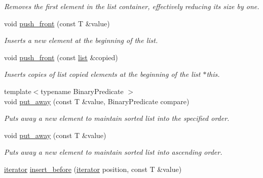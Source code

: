 \begin{DoxyCompactItemize}
\begin{DoxyCompactList}\small\item\em Removes the first element in the {\itshape list} container, effectively reducing its size by one. \end{DoxyCompactList}\item 
\hypertarget{classofeli_1_1list_a87b7f6a90670e08d99e23f3377b001f9}{void \hyperlink{classofeli_1_1list_a87b7f6a90670e08d99e23f3377b001f9}{push\-\_\-front} (const T \&value)}\label{classofeli_1_1list_a87b7f6a90670e08d99e23f3377b001f9}

\begin{DoxyCompactList}\small\item\em Inserts a new element at the beginning of the list. \end{DoxyCompactList}\item 
\hypertarget{classofeli_1_1list_a05ae0af886d7932bdf5a5183e2a64c91}{void \hyperlink{classofeli_1_1list_a05ae0af886d7932bdf5a5183e2a64c91}{push\-\_\-front} (const \hyperlink{classofeli_1_1list}{list} \&copied)}\label{classofeli_1_1list_a05ae0af886d7932bdf5a5183e2a64c91}

\begin{DoxyCompactList}\small\item\em Inserts copies of list {\itshape copied} elements at the beginning of the list {\itshape $\ast$this}. \end{DoxyCompactList}\item 
\hypertarget{classofeli_1_1list_a3925aa31728a510af35d3229cd00a43f}{{\footnotesize template$<$typename Binary\-Predicate $>$ }\\void \hyperlink{classofeli_1_1list_a3925aa31728a510af35d3229cd00a43f}{put\-\_\-away} (const T \&value, Binary\-Predicate compare)}\label{classofeli_1_1list_a3925aa31728a510af35d3229cd00a43f}

\begin{DoxyCompactList}\small\item\em Puts away a new element to maintain sorted list into the specified order. \end{DoxyCompactList}\item 
\hypertarget{classofeli_1_1list_a0970694ba9e35222daa2ecc156f71661}{void \hyperlink{classofeli_1_1list_a0970694ba9e35222daa2ecc156f71661}{put\-\_\-away} (const T \&value)}\label{classofeli_1_1list_a0970694ba9e35222daa2ecc156f71661}

\begin{DoxyCompactList}\small\item\em Puts away a new element to maintain sorted list into ascending order. \end{DoxyCompactList}\item 
\hypertarget{classofeli_1_1list_a347778b1ef2f0530cb73403665f28caf}{\hyperlink{classofeli_1_1list_1_1iterator}{iterator} \hyperlink{classofeli_1_1list_a347778b1ef2f0530cb73403665f28caf}{insert\-\_\-before} (\hyperlink{classofeli_1_1list_1_1iterator}{iterator} position, const T \&value)}\label{classofeli_1_1list_a347778b1ef2f0530cb73403665f28caf}


\end{DoxyCompactItemize}
